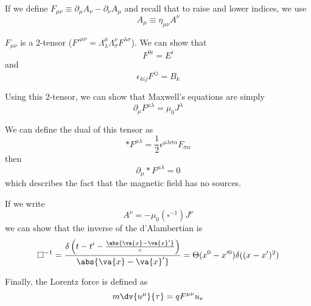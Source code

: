 \documentclass[a4paper,twoside,master.tex]{subfiles}
\begin{document}
If we define $ F_{\mu \nu} \equiv \partial_{\mu} A_{\nu} - \partial_{\nu} A_{\mu} $ and recall that to raise and lower indices, we use
\begin{equation}
    A_{\mu} \equiv \eta_{\mu \nu} A^{\nu}
\end{equation}

$ F_{\mu \nu} $ is a 2-tensor ($ F'^{\mu \nu} = \Lambda^{\mu}_{\lambda} \Lambda^{\nu}_{\sigma} F^{\lambda \sigma} $). We can show that
\begin{equation}
    F^{0i} = E^{i}
\end{equation}
and
\begin{equation}
    \epsilon_{kij} F^{ij} = B_{k}
\end{equation}

Using this 2-tensor, we can show that Maxwell's equations are simply
\begin{equation}
    \partial_{\mu} F^{\mu \lambda} = \mu_0 J^{\lambda}
\end{equation}

We can define the dual of this tensor as
\begin{equation}
    \ast F^{\mu \lambda} = \frac{1}{2} \epsilon^{\mu \lambda \sigma \alpha} F_{\sigma \alpha}
\end{equation}
then
\begin{equation}
    \partial_{\mu} \ast F^{\mu \lambda} = 0
\end{equation}
which describes the fact that the magnetic field has no sources.

If we write
\begin{equation}
    A^{\nu} = - \mu_0 (\square^{-1}) J^{\nu}
\end{equation}
we can show that the inverse of the d'Alambertian is
\begin{equation}
    \square^{-1} = \frac{\delta\left( t-t'- \frac{\abs{ \va{x} - \va{x}'}}{c} \right)}{\abs{ \va{x} - \va{x}'}} = \Theta(x^0 - x'^0) \delta( (x-x')^2)
\end{equation}

Finally, the Lorentz force is defined as
\begin{equation}
    m \dv{u^{\mu}}{\tau} = q F^{\mu \nu} u_{\nu}
\end{equation}
\end{document}
